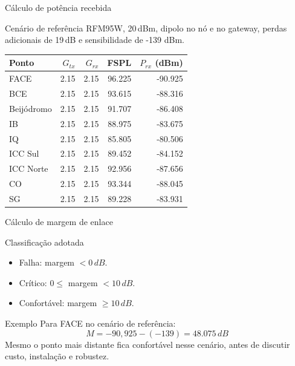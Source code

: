 \documentclass[aspectratio=169]{beamer}
\newcommand{\SI}[2]{#1\,#2}
\begin{document}
\begin{frame}{Cálculo de potência recebida}
\small
\begin{block}{Cenário de referência}
RFM95W, \SI{20}{dBm}, dipolo no nó e no gateway, perdas adicionais de \SI{19}{dB} e sensibilidade de -139 dBm.
\end{block}
\begin{table}
\centering
\scriptsize
\begin{tabular}{lrrrr}
\toprule
Ponto & $G_{tx}$ & $G_{rx}$ & FSPL & $P_{rx}$ (dBm) \\
\midrule
FACE & 2.15 & 2.15 & 96.225 & -90.925 \\
BCE & 2.15 & 2.15 & 93.615 & -88.316 \\
Beijódromo & 2.15 & 2.15 & 91.707 & -86.408 \\
IB & 2.15 & 2.15 & 88.975 & -83.675 \\
IQ & 2.15 & 2.15 & 85.805 & -80.506 \\
ICC Sul & 2.15 & 2.15 & 89.452 & -84.152 \\
ICC Norte & 2.15 & 2.15 & 92.956 & -87.656 \\
CO & 2.15 & 2.15 & 93.344 & -88.045 \\
SG & 2.15 & 2.15 & 89.228 & -83.931 \\
\bottomrule
\end{tabular}
\end{table}
\end{frame}

\begin{frame}{Cálculo de margem de enlace}
\small
\begin{block}{Classificação adotada}
\begin{itemize}
  \item Falha: margem $< \SI{0}{dB}$.
  \item Crítico: $0 \leq$ margem $< \SI{10}{dB}$.
  \item Confortável: margem $\geq \SI{10}{dB}$.
\end{itemize}
\end{block}
\begin{block}{Exemplo}
Para FACE no cenário de referência:
\[
M = -90{,}925 - (-139) = \SI{48.075}{dB}
\]
Mesmo o ponto mais distante fica confortável nesse cenário, antes de discutir custo, instalação e robustez.
\end{block}
\end{frame}
\end{document}
